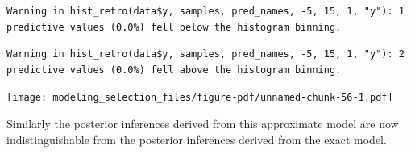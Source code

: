 \documentclass[
  letterpaper,
  DIV=11,
  numbers=noendperiod]{scrartcl}
\begin{document}
\begin{verbatim}
Warning in hist_retro(data$y, samples, pred_names, -5, 15, 1, "y"): 1
predictive values (0.0%) fell below the histogram binning.
\end{verbatim}

\begin{verbatim}
Warning in hist_retro(data$y, samples, pred_names, -5, 15, 1, "y"): 2
predictive values (0.0%) fell above the histogram binning.
\end{verbatim}

\texttt{[image: modeling\_selection\_files/figure-pdf/unnamed-chunk-56-1.pdf]}

Similarly the posterior inferences derived from this approximate model
are now indistinguishable from the posterior inferences derived from the
exact model.
\end{document}
